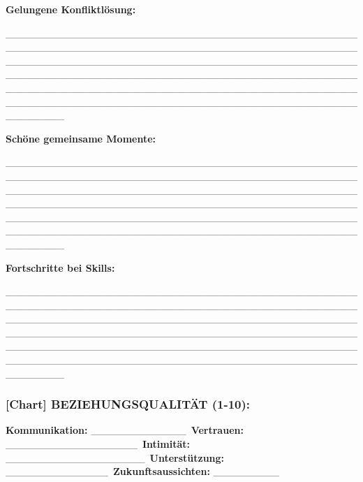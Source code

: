 \textbf{Gelungene Konfliktlösung:}

\_\_\_\_\_\_\_\_\_\_\_\_\_\_\_\_\_\_\_\_\_\_\_\_\_\_\_\_\_\_\_\_\_\_\_\_\_\_\_\_\_\_\_\_\_\_\_\_\_\_\_\_\_\_\_\_\_\_\_\_\_\_\_\_\_\_\_\_\_\_\_\_\_\_\_\_\_\_\_\_\_\_\_\_\_\_\_\_\_\_\_\_\_\_\_\_\_\_\_\_\_\_\_\_\_\_\_\_\_\_\_\_\_\_\_\_\_\_\_\_\_\_\_\_\_\_\_\_\_\_\_\_\_\_\_\_\_\_\_\_\_\_\_\_\_\_\_\_\_\_\_\_\_\_\_\_\_\_\_\_\_\_\_\_\_\_\_\_\_\_\_\_\_\_\_\_\_\_\_\_\_\_\_\_\_\_\_\_\_\_\_\_\_\_\_\_\_\_\_\_\_\_\_\_\_\_\_\_\_\_\_\_\_\_\_\_\_\_\_\_\_\_\_\_\_\_\_\_\_\_\_\_\_\_\_\_\_\_\_\_\_\_\_\_\_\_\_\_\_\_\_\_\_\_\_\_\_\_\_\_\_\_\_\_\_\_\_\_\_\_\_\_\_\_\_\_\_\_\_\_\_\_\_\_\_\_\_\_\_\_\_\_\_\_\_\_

\textbf{Schöne gemeinsame Momente:}

\_\_\_\_\_\_\_\_\_\_\_\_\_\_\_\_\_\_\_\_\_\_\_\_\_\_\_\_\_\_\_\_\_\_\_\_\_\_\_\_\_\_\_\_\_\_\_\_\_\_\_\_\_\_\_\_\_\_\_\_\_\_\_\_\_\_\_\_\_\_\_\_\_\_\_\_\_\_\_\_\_\_\_\_\_\_\_\_\_\_\_\_\_\_\_\_\_\_\_\_\_\_\_\_\_\_\_\_\_\_\_\_\_\_\_\_\_\_\_\_\_\_\_\_\_\_\_\_\_\_\_\_\_\_\_\_\_\_\_\_\_\_\_\_\_\_\_\_\_\_\_\_\_\_\_\_\_\_\_\_\_\_\_\_\_\_\_\_\_\_\_\_\_\_\_\_\_\_\_\_\_\_\_\_\_\_\_\_\_\_\_\_\_\_\_\_\_\_\_\_\_\_\_\_\_\_\_\_\_\_\_\_\_\_\_\_\_\_\_\_\_\_\_\_\_\_\_\_\_\_\_\_\_\_\_\_\_\_\_\_\_\_\_\_\_\_\_\_\_\_\_\_\_\_\_\_\_\_\_\_\_\_\_\_\_\_\_\_\_\_\_\_\_\_\_\_\_\_\_\_\_\_\_\_\_\_\_\_\_\_\_\_\_\_\_\_

\textbf{Fortschritte bei Skills:}

\_\_\_\_\_\_\_\_\_\_\_\_\_\_\_\_\_\_\_\_\_\_\_\_\_\_\_\_\_\_\_\_\_\_\_\_\_\_\_\_\_\_\_\_\_\_\_\_\_\_\_\_\_\_\_\_\_\_\_\_\_\_\_\_\_\_\_\_\_\_\_\_\_\_\_\_\_\_\_\_\_\_\_\_\_\_\_\_\_\_\_\_\_\_\_\_\_\_\_\_\_\_\_\_\_\_\_\_\_\_\_\_\_\_\_\_\_\_\_\_\_\_\_\_\_\_\_\_\_\_\_\_\_\_\_\_\_\_\_\_\_\_\_\_\_\_\_\_\_\_\_\_\_\_\_\_\_\_\_\_\_\_\_\_\_\_\_\_\_\_\_\_\_\_\_\_\_\_\_\_\_\_\_\_\_\_\_\_\_\_\_\_\_\_\_\_\_\_\_\_\_\_\_\_\_\_\_\_\_\_\_\_\_\_\_\_\_\_\_\_\_\_\_\_\_\_\_\_\_\_\_\_\_\_\_\_\_\_\_\_\_\_\_\_\_\_\_\_\_\_\_\_\_\_\_\_\_\_\_\_\_\_\_\_\_\_\_\_\_\_\_\_\_\_\_\_\_\_\_\_\_\_\_\_\_\_\_\_\_\_\_\_\_\_\_\_

\hypertarget{beziehungsqualituxe4t-1-10}{%
\subsubsection{\texorpdfstring{\textbf{[Chart] BEZIEHUNGSQUALITÄT (1-10):}}{[Chart] BEZIEHUNGSQUALITÄT (1-10):}}\label{beziehungsqualituxe4t-1-10}}

\textbf{Kommunikation:} \_\_\_\_\_\_\_\_\_\_\_\_\_\
\textbf{Vertrauen:} \_\_\_\_\_\_\_\_\_\_\_\_\_\_\_\_\_\_\
\textbf{Intimität:} \_\_\_\_\_\_\_\_\_\_\_\_\_\_\_\_\_\_\_\
\textbf{Unterstützung:} \_\_\_\_\_\_\_\_\_\_\_\_\_\_\
\textbf{Zukunftsaussichten:} \_\_\_\_\_\_\_\_\_

